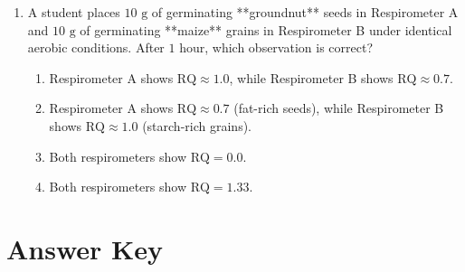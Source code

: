 \documentclass[11pt, a4paper]{article}
\begin{document}
\begin{enumerate}[label=\textbf{\arabic*.}]
\item A student places $10\text{ g}$ of germinating **groundnut** seeds in Respirometer A and $10\text{ g}$ of germinating **maize** grains in Respirometer B under identical aerobic conditions. After $1\text{ hour}$, which observation is correct?
\begin{enumerate}[label=(\Alph*)]
    \item Respirometer A shows $\text{RQ} \approx 1.0$, while Respirometer B shows $\text{RQ} \approx 0.7$.
    \item Respirometer A shows $\text{RQ} \approx 0.7$ (fat-rich seeds), while Respirometer B shows $\text{RQ} \approx 1.0$ (starch-rich grains).
    \item Both respirometers show $\text{RQ} = 0.0$.
    \item Both respirometers show $\text{RQ} = 1.33$.
\end{enumerate}

\end{enumerate}

\newpage

\section*{Answer Key}
\end{document}
